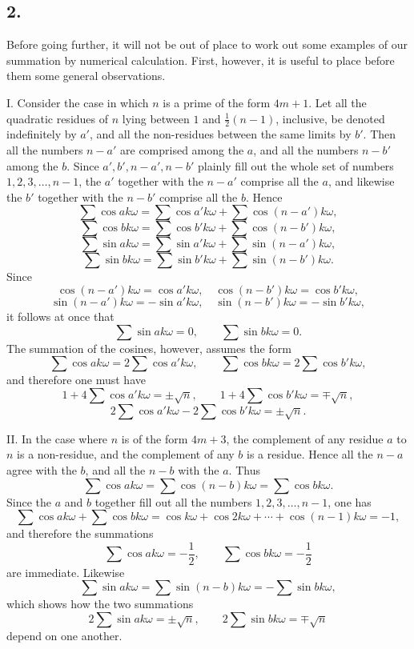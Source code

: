 \documentclass[12pt]{article}
\begin{document}
\subsection*{2.}

Before going further, it will not be out of place to work out some examples of our summation by numerical calculation. First, however, it is useful to place before them some general observations.

I. Consider the case in which $n$ is a prime of the form $4m+1$. Let all the quadratic residues of $n$ lying between $1$ and $\frac12(n-1)$, inclusive, be denoted indefinitely by $a'$, and all the non-residues between the same limits by $b'$. Then all the numbers $n-a'$ are comprised among the $a$, and all the numbers $n-b'$ among the $b$. Since $a',b',n-a',n-b'$ plainly fill out the whole set of numbers $1,2,3,\ldots,n-1$, the $a'$ together with the $n-a'$ comprise all the $a$, and likewise the $b'$ together with the $n-b'$ comprise all the $b$. Hence
\[
\sum\cos ak\omega=\sum\cos a'k\omega+\sum\cos(n-a')k\omega,
\]
\[
\sum\cos bk\omega=\sum\cos b'k\omega+\sum\cos(n-b')k\omega,
\]
\[
\sum\sin ak\omega=\sum\sin a'k\omega+\sum\sin(n-a')k\omega,
\]
\[
\sum\sin bk\omega=\sum\sin b'k\omega+\sum\sin(n-b')k\omega.
\]
Since
\[
\cos(n-a')k\omega=\cos a'k\omega,\quad
\cos(n-b')k\omega=\cos b'k\omega,
\]
\[
\sin(n-a')k\omega=-\sin a'k\omega,\quad
\sin(n-b')k\omega=-\sin b'k\omega,
\]
it follows at once that
\[
\sum\sin ak\omega=0,\qquad \sum\sin bk\omega=0.
\]
The summation of the cosines, however, assumes the form
\[
\sum\cos ak\omega=2\sum\cos a'k\omega,\qquad
\sum\cos bk\omega=2\sum\cos b'k\omega,
\]
and therefore one must have
\[
1+4\sum\cos a'k\omega=\pm\sqrt n,\qquad
1+4\sum\cos b'k\omega=\mp\sqrt n,
\]
\[
2\sum\cos a'k\omega-2\sum\cos b'k\omega=\pm\sqrt n.
\]

II. In the case where $n$ is of the form $4m+3$, the complement of any residue $a$ to $n$ is a non-residue, and the complement of any $b$ is a residue. Hence all the $n-a$ agree with the $b$, and all the $n-b$ with the $a$. Thus
\[
\sum\cos ak\omega=\sum\cos(n-b)k\omega=\sum\cos bk\omega.
\]
Since the $a$ and $b$ together fill out all the numbers $1,2,3,\ldots,n-1$, one has
\[
\sum\cos ak\omega+\sum\cos bk\omega
=\cos k\omega+\cos2k\omega+\cdots+\cos(n-1)k\omega=-1,
\]
and therefore the summations
\[
\sum\cos ak\omega=-\frac12,\qquad \sum\cos bk\omega=-\frac12
\]
are immediate. Likewise
\[
\sum\sin ak\omega=\sum\sin(n-b)k\omega=-\sum\sin bk\omega,
\]
which shows how the two summations
\[
2\sum\sin ak\omega=\pm\sqrt n,\qquad
2\sum\sin bk\omega=\mp\sqrt n
\]
depend on one another.
\end{document}
